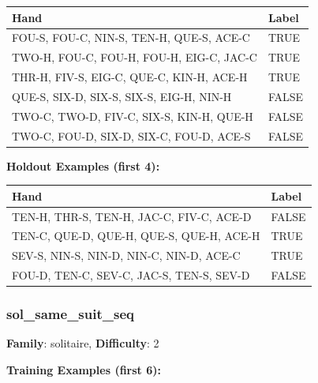 \documentclass[10pt,a4paper]{article}
\begin{document}
\begin{small}
\begin{tabular}{p{8cm}l}
\toprule
Hand & Label \\
\midrule
FOU-S, FOU-C, NIN-S, TEN-H, QUE-S, ACE-C & \textcolor{positive}{TRUE} \\
TWO-H, FOU-C, FOU-H, FOU-H, EIG-C, JAC-C & \textcolor{positive}{TRUE} \\
THR-H, FIV-S, EIG-C, QUE-C, KIN-H, ACE-H & \textcolor{positive}{TRUE} \\
QUE-S, SIX-D, SIX-S, SIX-S, EIG-H, NIN-H & \textcolor{negative}{FALSE} \\
TWO-C, TWO-D, FIV-C, SIX-S, KIN-H, QUE-H & \textcolor{negative}{FALSE} \\
TWO-C, FOU-D, SIX-D, SIX-C, FOU-D, ACE-S & \textcolor{negative}{FALSE} \\
\bottomrule
\end{tabular}
\end{small}

\textbf{Holdout Examples (first 4):}

\begin{small}
\begin{tabular}{p{8cm}l}
\toprule
Hand & Label \\
\midrule
TEN-H, THR-S, TEN-H, JAC-C, FIV-C, ACE-D & \textcolor{negative}{FALSE} \\
TEN-C, QUE-D, QUE-H, QUE-S, QUE-H, ACE-H & \textcolor{positive}{TRUE} \\
SEV-S, NIN-S, NIN-D, NIN-C, NIN-D, ACE-C & \textcolor{positive}{TRUE} \\
FOU-D, TEN-C, SEV-C, JAC-S, TEN-S, SEV-D & \textcolor{negative}{FALSE} \\
\bottomrule
\end{tabular}
\end{small}

\vspace{0.5cm}

\subsubsection{sol\_same\_suit\_seq}

\textbf{Family}: solitaire, \textbf{Difficulty}: 2

\textbf{Training Examples (first 6):}
\end{document}
